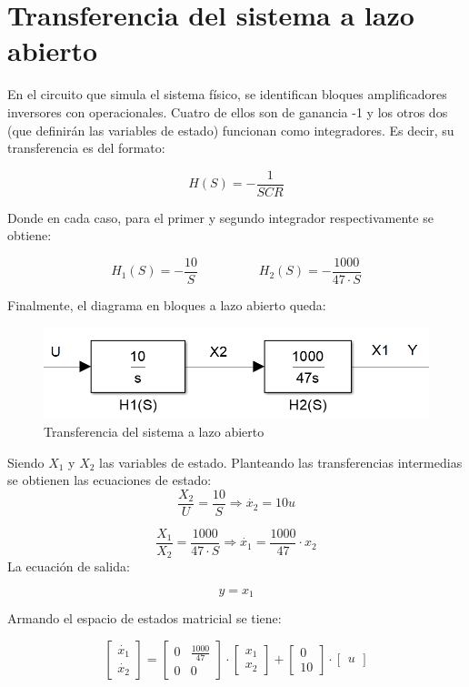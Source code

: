 \documentclass{article}
\begin{document}
\newgeometry{} %



\tableofcontents
\newpage

\section{Transferencia del sistema a lazo abierto}

En el circuito que simula el sistema físico, se identifican bloques amplificadores inversores con operacionales. Cuatro de ellos son de ganancia -1 y los otros dos (que definirán las variables de estado) funcionan como integradores. Es decir, su transferencia es del formato:

\[
H(S) = -\frac{1}{SCR}
\]

Donde en cada caso, para el primer y segundo integrador respectivamente se obtiene:

\[
H_1(S) = -\frac{10}{S} \hspace{2cm} H_2(S) = -\frac{1000}{47 \cdot S}
\]

Finalmente, el diagrama en bloques a lazo abierto queda:

\begin{figure}[H]
\centering
\includegraphics[width=0.7\linewidth]{Imagenes/HLazoAbierto.png}
\caption{Transferencia del sistema a lazo abierto}
\label{fig:Circuito}
\end{figure}

Siendo $X_1$ y $X_2$ las variables de estado. Planteando las transferencias intermedias se obtienen las ecuaciones de estado:
\[
\frac{X_2}{U} = \frac{10}{S} \Longrightarrow \dot{x_2} = 10u
\]

\[
\frac{X_1}{X_2} = \frac{1000}{47 \cdot S} \Longrightarrow \dot{x_1} = \frac{1000}{47} \cdot x_2
\]
La ecuación de salida:

\[
y = x_1
\]

Armando el espacio de estados matricial se tiene:

\[
\begin{bmatrix}
\dot{x_1} \\
\dot{x_2} 
\end{bmatrix}
=
\begin{bmatrix}
0 & \frac{1000}{47} \\
0 & 0 
\end{bmatrix}
\cdot
\begin{bmatrix}
x_1 \\
x_2 
\end{bmatrix}
+
\begin{bmatrix}
0 \\
10 
\end{bmatrix}
\cdot
\begin{bmatrix}
u
\end{bmatrix}
\]
\end{document}
